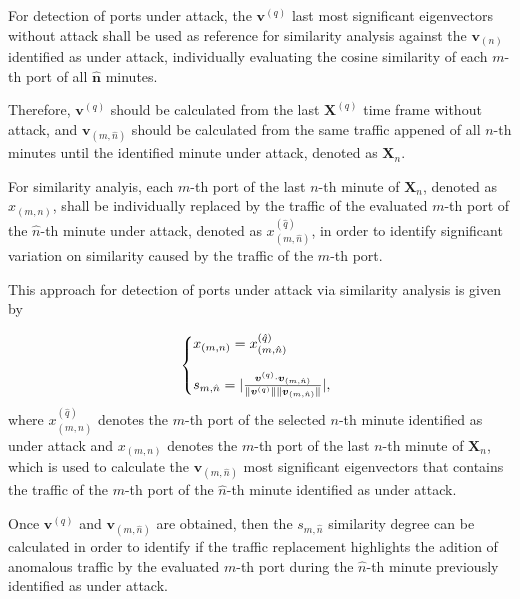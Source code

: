 \documentclass{bmcart}
\DeclarePairedDelimiter\abs{\lvert}{\rvert}%
\DeclarePairedDelimiter\norm{\lVert}{\rVert}%
\begin{document}
For detection of ports under attack, the $\boldsymbol{v}^{(q)}$ last most significant eigenvectors without attack shall be used as reference for similarity analysis against the $\boldsymbol{v}_{(n)}$ identified as under attack, individually evaluating the cosine similarity of each $m$-th port of all $\boldsymbol{\hat{n}}$ minutes.

Therefore, $\boldsymbol{v}^{(q)}$ should be calculated from the last $\boldsymbol{X}^{(q)}$ time frame without attack, and $\boldsymbol{v}_{(m,\hat{n})}$ should be calculated from the same traffic appened of all $n$-th minutes until the identified minute under attack, denoted as $\boldsymbol{X}_n$. 

For similarity analyis, each $m$-th port of the last $n$-th minute of $\boldsymbol{X}_n$, denoted as $x_{(m,n)}$, shall be individually replaced by the traffic of the evaluated $m$-th port of the $\hat{n}$-th minute under attack, denoted as $x^{(\hat{q})}_{(m,\hat{n})}$, in order to identify significant variation on similarity caused by the traffic of the $m$-th port. 

This approach for detection of ports under attack via similarity analysis is given by

\begin{equation}\label{eq:eq15}
  \left\{
  \begin{array}{@{}ll@{}}
    x_{(m,n)} = x^{(\hat{q})}_{(m,\hat{n})} \\
    \\
    s_{m,\hat{n}} = \abs{\frac{\boldsymbol{v}^{(q)} \cdot \boldsymbol{v}_{(m,\hat{n})}}{\norm{\boldsymbol{v}^{(q)}}\norm{\boldsymbol{v}_{(m,\hat{n})}}}},
  \end{array}\right.
\end{equation}
where $x^{(\hat{q})}_{(m,\hat{n})}$ denotes the $m$-th port of the selected $n$-th minute identified as under attack and $x_{(m,n)}$ denotes the $m$-th port of the last $n$-th minute of $\boldsymbol{X}_n$, which is used to calculate the $\boldsymbol{v}_{(m,\hat{n})}$ most significant eigenvectors that contains the traffic of the $m$-th port of the $\hat{n}$-th minute identified as under attack.

Once $\boldsymbol{v}^{(q)}$ and $\boldsymbol{v}_{(m,\hat{n})}$ are obtained, then the $s_{m,\hat{n}}$ similarity degree can be calculated in order to identify if the traffic replacement highlights the adition of anomalous traffic by the evaluated $m$-th port during the $\hat{n}$-th minute previously identified as under attack. 
\end{document}
